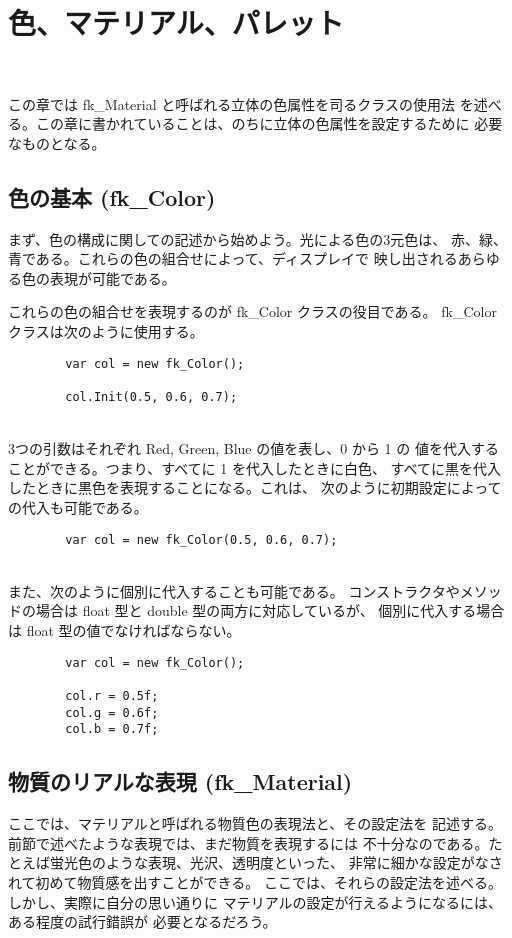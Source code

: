 \chapter{色、マテリアル、パレット} \label{chap:material} ~

この章では fk\_Material と呼ばれる立体の色属性を司るクラスの使用法
を述べる。この章に書かれていることは、のちに立体の色属性を設定するために
必要なものとなる。
\section{色の基本 (fk\_Color)}
まず、色の構成に関しての記述から始めよう。光による色の3元色は、
赤、緑、青である。これらの色の組合せによって、ディスプレイで
映し出されるあらゆる色の表現が可能である。

これらの色の組合せを表現するのが fk\_Color クラスの役目である。
fk\_Color クラスは次のように使用する。
\\
\begin{screen}
\begin{verbatim}
        var col = new fk_Color();

        col.Init(0.5, 0.6, 0.7);
\end{verbatim}
\end{screen}
~ \\
3つの引数はそれぞれ Red, Green, Blue の値を表し、0 から 1 の
値を代入することができる。つまり、すべてに 1 を代入したときに白色、
すべてに黒を代入したときに黒色を表現することになる。これは、
次のように初期設定によっての代入も可能である。
\\
\begin{screen}
\begin{verbatim}
        var col = new fk_Color(0.5, 0.6, 0.7);
\end{verbatim}
\end{screen}
~ \\
また、次のように個別に代入することも可能である。
コンストラクタやメソッドの場合は float 型と double 型の両方に対応しているが、
個別に代入する場合は float 型の値でなければならない。
\\
\begin{screen}
\begin{verbatim}
        var col = new fk_Color();

        col.r = 0.5f;
        col.g = 0.6f;
        col.b = 0.7f;
\end{verbatim}
\end{screen}
\section{物質のリアルな表現 (fk\_Material)}
ここでは、マテリアルと呼ばれる物質色の表現法と、その設定法を
記述する。前節で述べたような表現では、まだ物質を表現するには
不十分なのである。たとえば蛍光色のような表現、光沢、透明度といった、
非常に細かな設定がなされて初めて物質感を出すことができる。
ここでは、それらの設定法を述べる。しかし、実際に自分の思い通りに
マテリアルの設定が行えるようになるには、ある程度の試行錯誤が
必要となるだろう。

